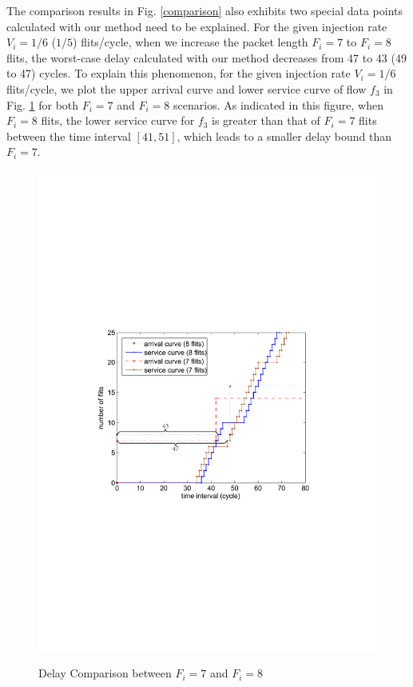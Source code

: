 \documentclass[10pt,journal]{IEEEtran}
\begin{document}
The comparison results in Fig. \ref{comparison} also exhibits two special data points calculated with our method need to be explained. For the given injection rate $V_i=1/6$ ($1/5$) flits/cycle, when we increase the packet length $F_i=7$ to $F_i=8$ flits, the worst-case delay calculated with our method decreases from 47 to 43 (49 to 47) cycles. To explain this phenomenon, for the given injection rate $V_i=1/6$ flits/cycle, we plot the upper arrival curve and lower service curve of flow $f_3$ in Fig. \ref{reason} for both $F_i=7$ and $F_i=8$ scenarios. As indicated in this figure, when $F_i=8$ flits, the lower service curve for $f_3$ is greater than that of $F_i=7$ flits between the time interval $[41,51]$, which leads to a smaller delay bound than $F_i=7$.
\begin{figure}
  \centering
  \includegraphics[scale=0.63]{figures/reason.pdf}\\
  \caption{Delay Comparison between $F_i=7$ and $F_i=8$}\label{reason}
\end{figure}
\end{document}
